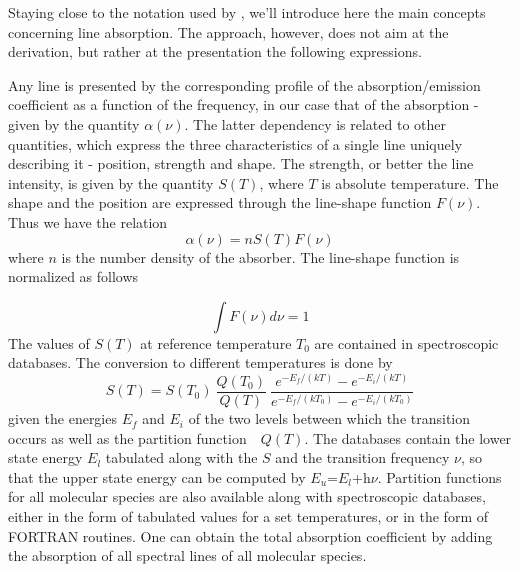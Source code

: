 
\label{sec:line_absorption}

 
Staying close to the notation used by \citet{goodyandyung:89}, we'll introduce here the main concepts concerning
line absorption. The approach, however, does not aim  at the
derivation, but rather at the presentation the following expressions.

Any line is presented by the corresponding profile of the absorption/emission
coefficient as a function of the frequency, in our case that of the
absorption - given by the quantity $\alpha(\nu)$. The latter dependency
is related to other quantities, which express the three
characteristics of a single line uniquely describing it - position,
strength and shape. 
The strength, or better the line intensity, is given by the quantity
$S(T)$, where $T$ is absolute temperature. The shape and the position are expressed through the
line-shape function $F(\nu)$. Thus we have the relation    
\begin{equation}
  \alpha(\nu)=nS(T)F(\nu)
\end{equation} 
where $n$ is the number density of the absorber. The line-shape
function is normalized as follows

\begin{equation}
  \int F(\nu)d\nu=1
\end{equation}
The values of $S(T)$ at reference temperature $T_0$ are contained in
spectroscopic databases. The conversion to different temperatures is
done by
\begin{equation}
  S(T)=S(T_0)~\frac{Q(T_0)}{Q(T)}~\frac{e^{-E_f/(kT)}
    - e^{-E_i/(kT)}}{e^{-E_f/(kT_0)} - e^{-E_i/(kT_0)}}
\end{equation}
given the energies $E_f$ and $E_i$ of the two levels between which the
transition occurs as well as the partition function~~$Q(T)$. The
databases contain the lower state energy $E_l$ tabulated along with
the $S$ and the transition frequency $\nu$, so that the upper state
energy can be computed by $E_u$=$E_l$+h$\nu$. Partition functions for
all molecular species are also available along with spectroscopic
databases, either in the form of tabulated values for a set
temperatures, or in the form of FORTRAN routines. One can obtain the
total absorption coefficient by adding the absorption of all spectral
lines of all molecular species.

